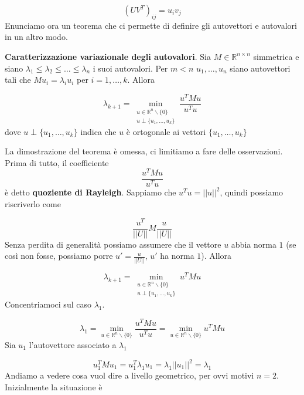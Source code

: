 \documentclass[12pt]{report}
\begin{document}
$$(UV^T)_{ij} = u_i v_j$$
Enunciamo ora un teorema che ci permette di definire gli autovettori e autovalori in un altro modo.

\begin{teo}
    \textbf{Caratterizzazione variazionale degli autovalori}. Sia $M\in \mathbb{R}^{n\times n}$ simmetrica e siano $\lambda_1\leq \lambda_2 \leq \dots \leq \lambda_n$ i suoi autovalori. Per $m < n$  $u_1,\dots,u_n$ siano autovettori tali che $Mu_i = \lambda_i u_i$ per $i = 1,\dots,k$. Allora 

    $$\lambda_{k+1} = \min_{\substack{u \in \mathbb{R}^n\backslash\{0\} \\ u \perp \{u_1,\dots,u_k\}}} \frac{u^T M u}{u^Tu}$$
    dove $u \perp \{u_1,\dots,u_k\}$ indica che $u$ è ortogonale ai vettori $\{u_1,\dots,u_k\}$ 
\end{teo}

\noindent La dimostrazione del teorema è omessa, ci limitiamo a fare delle osservazioni. Prima di tutto, il coefficiente 
$$\frac{u^T M u}{u^Tu}$$
è detto \textbf{quoziente di Rayleigh}.  Sappiamo che $u^T u = ||u||^2$, quindi possiamo riscriverlo come 

$$ \frac{u^T}{||U||} M \frac{u}{||U||}$$
Senza perdita di generalità possiamo assumere che il vettore $u$ abbia norma $1$ (se così non fosse, possiamo porre $u' =\frac{u}{||U||}$, $u'$ ha norma $1$). Allora 


    $$\lambda_{k+1} = \min_{\substack{u \in \mathbb{R}^n\backslash\{0\} \\ u \perp \{u_1,\dots,u_k\}}}  u^T M u$$ 
    Concentriamoci sul caso $\lambda_1$.

    $$\lambda_1 = \min_{u \in \mathbb{R}^n\backslash\{0\}} \frac{u^T M u}{u^Tu} = \min_{u \in \mathbb{R}^n\backslash\{0\}} u^TMu $$
    Sia $u_1$ l'autovettore associato a $\lambda_1$
    
    $$u_1^TMu_1 = u_1^T \lambda_1 u_1 = \lambda_1 ||u_1||^2 = \lambda_1$$
    Andiamo a vedere cosa vuol dire a livello geometrico, per ovvi motivi $n = 2$. Inizialmente la situazione è


\begin{center}
\end{center}
\end{document}
